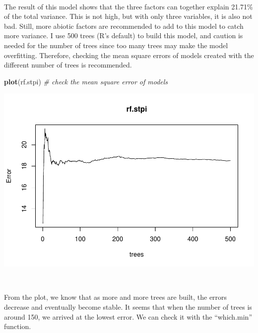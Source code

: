 \documentclass[
]{article}
\newenvironment{Shaded}{\begin{snugshade}}{\end{snugshade}}
\newcommand{\CommentTok}[1]{\textcolor[rgb]{0.56,0.35,0.01}{\textit{#1}}}
\newcommand{\KeywordTok}[1]{\textcolor[rgb]{0.13,0.29,0.53}{\textbf{#1}}}
\newcommand{\NormalTok}[1]{#1}
\newcommand{\OperatorTok}[1]{\textcolor[rgb]{0.81,0.36,0.00}{\textbf{#1}}}
\begin{document}
~

The result of this model shows that the three factors can together
explain 21.71\% of the total variance. This is not high, but with only
three variables, it is also not bad. Still, more abiotic factors are
recommended to add to this model to catch more variance. I use 500 trees
(R's default) to build this model, and caution is needed for the number
of trees since too many trees may make the model overfitting. Therefore,
checking the mean square errors of models created with the different
number of trees is recommended.

\begin{Shaded}
\begin{Highlighting}[]
\KeywordTok{plot}\NormalTok{(rf.stpi) }\CommentTok{# check the mean square error of models}
\end{Highlighting}
\end{Shaded}

\includegraphics{index_files/figure-latex/unnamed-chunk-6-1.pdf}

~

From the plot, we know that as more and more trees are built, the errors
decrease and eventually become stable. It seems that when the number of
trees is around 150, we arrived at the lowest error. We can check it
with the ``which.min'' function.

\begin{Shaded}
\end{Shaded}
\end{document}
